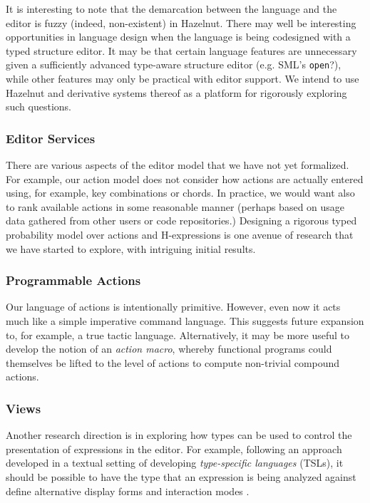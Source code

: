 \documentclass[preprint,9pt]{sigplanconf}
\begin{document}
It is interesting to note that the demarcation between the language and the editor is fuzzy (indeed, non-existent) in Hazelnut. There may well be interesting opportunities in language design when the language is being codesigned with a typed structure editor. It may be that certain language features are unnecessary given a sufficiently advanced type-aware structure editor (e.g. SML's \texttt{open}?), while other features may only be practical with editor support. We intend to use Hazelnut and derivative systems thereof as a platform for rigorously exploring such questions.

\subsubsection{Editor Services}
There are various aspects of the editor model that we have not yet formalized. For example, our action model does not consider how actions are actually entered using, for example, key combinations or chords. In practice, we would want also to rank available actions in some reasonable manner (perhaps based on usage data gathered from other users or code repositories.) Designing a rigorous typed probability model over actions and H-expressions is one avenue of research that we have started to explore, with intriguing initial results.

\subsubsection{Programmable Actions}
Our language of actions is intentionally primitive. However, even now it acts much like a simple imperative command language. This suggests future expansion to, for example, a true tactic language. Alternatively, it may be more useful to develop the notion of an \emph{action macro}, whereby functional programs could themselves be lifted to the level of actions to compute non-trivial compound actions.

\subsubsection{Views}
Another research direction is in exploring how types can be used to control the presentation of expressions in the editor. For example, following an approach developed in a textual setting of developing \emph{type-specific languages} (TSLs), it should be possible to have the type that an expression is being analyzed against define alternative display forms and interaction modes \cite{TSLs}.
\end{document}
